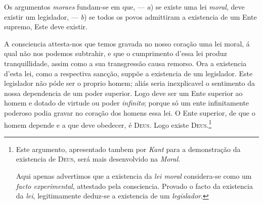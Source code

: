 Os argumentos \emph{moraes} fundam-se em que, --- \emph{a}) se existe uma lei
\emph{moral}, deve existir um legislador, --- \emph{b}) se todos os povos admittiram a
existencia de um Ente supremo, Este deve existir.

 A consciencia attesta-nos que temos gravada no nosso coração uma lei moral, á
qual não nos podemos subtrahir, e que o cumprimento d'essa lei produz tranquillidade,
assim como a sua transgressão causa remorso. Ora a existencia d'esta lei, como a
respectiva sancção, suppõe a existencia de um legislador. Este legislador não póde ser o
proprio homem; aliás seria inexplicavel o sentimento da nossa dependencia de um poder
superior. Logo deve ser um Ente superior ao homem e dotado de virtude ou poder
\emph{infinito}; porque só um ente infinitamente poderoso podia gravar no coração dos
homens essa lei. O Ente superior, de que o homem depende e a que deve obedecer, é
\textsc{Deus}. Logo existe \textsc{Deus}.\footnote{Este argumento, apresentado tambem
por \emph{Kant} para a demonstração da existencia de \textsc{Deus}, será mais
desenvolvido na \emph{Moral}.

Aqui apenas advertimos que a existencia da \emph{lei moral} considera-se como um
\emph{facto experimental}, attestado pela consciencia. Provado o facto da existencia da
\emph{lei}, legitimamente deduz-se a existencia de um \emph{legislador}.}

